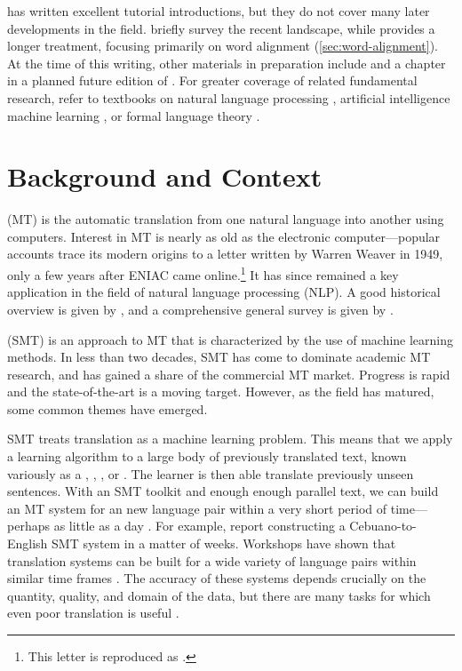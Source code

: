 \citet{Knight:1997:ai,Knight:1999:unpublished} has 
written excellent tutorial introductions, but they do not 
cover many later developments in the field.
\citet{Knight:2005:icassp} briefly survey the recent landscape, while 
\citet[chapter 2]{Ayan:2005:thesis} provides a longer treatment, focusing
primarily on word alignment (\textsection\ref{sec:word-alignment}).
At the time of this writing, other materials 
in preparation include \citet{Koehn:2008:book} 
and a chapter in a planned future
edition of \citet{Jurafsky:2000:book}.  For greater 
coverage of related fundamental research, 
refer to textbooks on natural language processing
\citep[NLP;][]{Manning:1999:book,Jurafsky:2000:book},
artificial intelligence \citep{Russell:2003:book}
machine learning \citep{Mitchell:1997:book},
or formal language theory \citep{Hopcroft:1979:book,Sipser:2005:book}.


\section{Background and Context}\label{sec:background-and-context}

 (MT) is the
automatic translation from one natural
language into another using computers.  Interest in 
MT is nearly as old as the electronic
computer---popular accounts trace
its modern origins to a letter written by Warren Weaver
in 1949, only a few years after ENIAC came online.\footnote{
This letter is reproduced as \citet{Weaver:1955:mt}.}
It has since remained
a key application in the field of natural
language processing (NLP).
A good historical overview is given by 
\citet{hutchins:2006:cuhk}, and a comprehensive
general survey is given by \citet{Dorr:1999:aic}.

 (SMT) 
is an approach to MT
that is characterized by the use of machine
learning methods.  In less than two decades,
SMT has come to dominate academic MT research,
and has gained a share of the commercial MT market.
Progress is rapid and the state-of-the-art 
is a moving target.  However, as the field has matured, 
some common themes have emerged.

SMT treats translation as a machine learning problem.  
This means that we apply a learning algorithm to a large body of 
previously translated text, known variously as
a , , 
, or .
The learner is then able translate
previously unseen sentences.  With an SMT toolkit and 
enough enough parallel text, we can build an MT system for
an new language pair within a very short period of time---
perhaps as little as a day 
\citep{Al-Onaizan:1999:tr,Oard:2003:mtsummit,Oard:2003:naacl}.
For example, \citet{Oard:2003:mtsummit} report
constructing a Cebuano-to-English SMT system in a matter of 
weeks.  Workshops have shown that translation systems
can be built for a wide variety of language pairs within
similar time frames \citep{Koehn:2005:wpt,Koehn:2006:smt,Callison-Burch:2007:smt}.
The accuracy of these systems depends crucially on the quantity,
quality, and domain of the data,
but there are many tasks for which even poor translation 
is useful \citep{Church:1993:mt}.  


